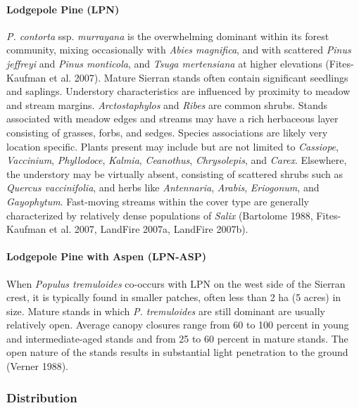 \paragraph{Lodgepole Pine (LPN)} \emph{P. contorta} ssp. \emph{murrayana} is the overwhelming dominant within its forest community, mixing occasionally with \emph{Abies magnifica}, and with scattered \emph{Pinus jeffreyi}  and \emph{Pinus monticola}, and \emph{Tsuga mertensiana} at higher elevations (Fites-Kaufman et al. 2007). Mature Sierran stands often contain significant seedlings and saplings. Understory characteristics are influenced by proximity to meadow and stream margins. \emph{Arctostaphylos} and \emph{Ribes} are common shrubs. Stands associated with meadow edges and streams may have a rich herbaceous layer consisting of grasses, forbs, and sedges. Species associations are likely very location specific. Plants present may include but are not limited to \emph{Cassiope}, \emph{Vaccinium}, \emph{Phyllodoce}, \emph{Kalmia}, \emph{Ceanothus}, \emph{Chrysolepis}, and \emph{Carex}. Elsewhere, the understory may be virtually absent, consisting of scattered shrubs such as \emph{Quercus vaccinifolia}, and herbs like \emph{Antennaria}, \emph{Arabis}, \emph{Eriogonum}, and \emph{Gayophytum}. Fast-moving streams within the cover type are generally characterized by relatively dense populations of \emph{Salix} (Bartolome 1988, Fites-Kaufman et al. 2007, LandFire 2007a, LandFire 2007b).  

\paragraph{Lodgepole Pine with Aspen (LPN-ASP)}	When \emph{Populus tremuloides} co-occurs with LPN on the west side of the Sierran crest, it is typically found in smaller patches, often less than 2 ha (5 acres) in size. Mature stands in which \emph{P. tremuloides} are still dominant are usually relatively open. Average canopy closures range from 60 to 100 percent in young and intermediate-aged stands and from 25 to 60 percent in mature stands. The open nature of the stands results in substantial light penetration to the ground (Verner 1988).

\subsubsection{Distribution}
